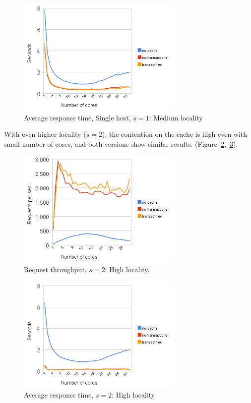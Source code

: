 \documentclass[preprint,natbib,11pt]{sigplanconf}
\begin{document}
\begin{figure}
 \begin{center}
  \includegraphics[width=8cm]{response-time-single-host-1.png}
 \end{center}
 \caption{Average response time, Single host, $s = 1$: Medium locality}
 \label{fig:response-time-single-host-1}
\end{figure}

With even higher locality ($s=2$), the contention on the cache is high even with
small number of cores, and both versions show similar results.
(Figure~\ref{fig:request-throughput-2},~\ref{fig:response-time-2}).

\begin{figure}
 \begin{center}
  \includegraphics[width=8cm]{transaction-rate-client-server-2.png}
 \end{center}
 \caption{Request throughput, $s = 2$: High locality.}
 \label{fig:request-throughput-2}
\end{figure}
\begin{figure}
 \begin{center}
  \includegraphics[width=8cm]{response-time-client-server-2.png}
 \end{center}
 \caption{Average response time, $s = 2$: High locality}
 \label{fig:response-time-2}
\end{figure}
\end{document}
